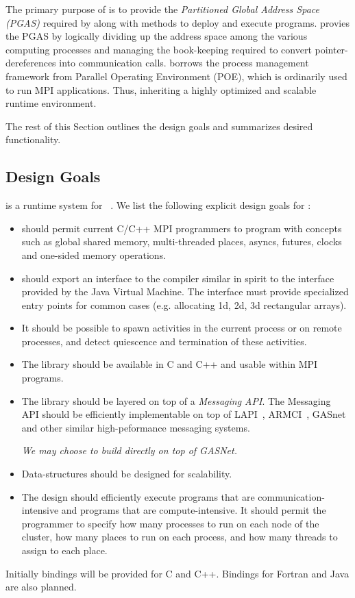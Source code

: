 The primary purpose of \Xtenlib{} is to provide the \textit{Partitioned
Global Address Space (PGAS)} required by \Xten{} along with methods to
deploy and execute \Xten{} programs. \Xtenlib{} provies the PGAS by
logically dividing up the address space among the various computing
processes and managing the book-keeping required to convert
pointer-dereferences into communication calls. \Xtenlib{} borrows the
process management framework from Parallel Operating Environment (POE),
which is ordinarily used to run MPI applications. Thus, inheriting a
highly optimized and scalable runtime environment.

The rest of this Section outlines the design goals and summarizes
desired functionality.

\subsection{Design Goals}
\Xtenlib{} is a runtime system for \Xten{}~\cite{x10}. 
We list the following explicit design goals for \Xtenlib:
\begin{itemize}
{}\item \Xtenlib{} should permit current C/C++ MPI programmers to
 program with \Xten{} concepts such as global shared memory,
 multi-threaded places, asyncs, futures, clocks and one-sided memory
 operations.

 {}\item \Xtenlib{} should export an interface to the compiler
 similar in spirit to the interface provided by the Java Virtual
 Machine. The interface must provide specialized entry points for
 common cases (e.g.{} allocating 1d, 2d, 3d rectangular arrays).

\item It should be possible to spawn activities in the current 
  process or on remote processes, and detect quiescence and
  termination of these activities.

{}\item The library should be available in C and C++ and usable within
MPI programs.

{}\item The library should be layered on top of a {\em Messaging API}.
  The Messaging API should be efficiently implementable on top of
  LAPI~\cite{lapi}, ARMCI~\cite{armci}, GASnet~\cite{gasnet} and other
  similar high-peformance messaging systems.

  {\em We may choose to build directly on top of GASNet.}

\item Data-structures should be designed for scalability.

\item The design should efficiently execute programs that are 
 communication-intensive and programs that are compute-intensive. It
 should permit the programmer to specify how many processes to run on
 each node of the cluster, how many places to run on each process, and
 how many threads to assign to each place.
\end{itemize}
Initially bindings will be provided for C and C++. Bindings for Fortran
and Java are also planned.


